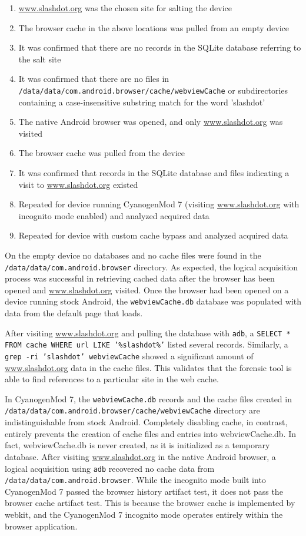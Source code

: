 \begin{enumerate}
\item \url{www.slashdot.org} was  the chosen site for salting the device
\item The browser cache in the above locations was pulled from an empty device
\item It was confirmed that there are no records in the SQLite database referring to the salt site
\item It was confirmed that there are no files in \texttt{/data/data/com.android.browser/cache/webviewCache} or subdirectories containing a case-insensitive substring match for the word 'slashdot'
\item The native Android browser was opened, and only \url{www.slashdot.org} was visited
\item The browser cache was pulled from the device
\item It was confirmed that records in the SQLite database and files indicating a visit to \url{www.slashdot.org} existed
\item Repeated for device running CyanogenMod 7 (visiting \url{www.slashdot.org} with incognito mode enabled) and analyzed acquired data
\item Repeated for device with custom cache bypass and analyzed acquired data
\end{enumerate}

On the empty device no databases and no cache files were found in the \texttt{/data/data/com.android.browser} directory.  As
expected, the logical acquisition process was successful in retrieving cached data after the browser has been opened and
\url{www.slashdot.org} visited.  Once the browser had been opened on a device running stock Android, the \texttt{webviewCache.db}
database was populated with data from the default page that loads. 

After visiting \url{www.slashdot.org} and pulling the database with \texttt{adb}, a \texttt{SELECT * FROM cache WHERE url LIKE
'\%slashdot\%'} listed several records.  Similarly, a \texttt{grep -ri 'slashdot' webviewCache} showed a significant amount of
\url{www.slashdot.org} data in the cache files.  This validates that the forensic tool is able to find references to a particular
site in the web cache.

In CyanogenMod 7, the \texttt{webviewCache.db} records and the cache files created in
\texttt{/data/data/com.android.browser/cache/webviewCache} directory are indistinguishable from stock Android.  Completely disabling
cache, in contrast, entirely prevents the creation of cache files and entries into webviewCache.db.  In fact, webviewCache.db is
never created, as it is initialized as a temporary database.  After visiting \url{www.slashdot.org} in the native Android browser, a
logical acquisition using \texttt{adb} recovered no cache data from \texttt{/data/data/com.android.browser}.  While the incognito
mode built into CyanogenMod 7 passed the browser history artifact test, it does not pass the browser cache artifact test. This is
because the browser cache is implemented by webkit, and the CyanogenMod 7 incognito mode operates entirely within the browser
application. 

